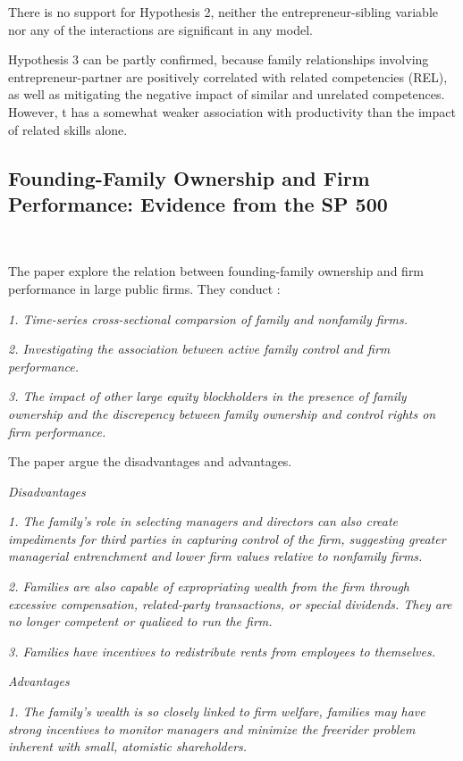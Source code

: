\documentclass{article}
\begin{document}
    There is no support for Hypothesis 2, neither the entrepreneur-sibling variable nor any of the interactions are significant in any model. 

    Hypothesis 3 can be partly confirmed, because family relationships involving entrepreneur-partner are positively correlated with related competencies (REL), as well as mitigating the negative impact of similar and unrelated competences.
    However, t has a somewhat weaker association with productivity than the impact of related skills alone.

\subsection{Founding-Family Ownership and Firm Performance: Evidence from the SP 500}
    ~\

    The paper explore the relation between founding-family ownership and firm performance in large public firms. 
    They conduct :

    \emph{1. Time-series cross-sectional comparsion of family and nonfamily firms. }

    \emph{2. Investigating the association between active family control and firm performance. }

    \emph{3. The impact of other large equity blockholders in the presence of family ownership and the discrepency between 
    family ownership and control rights on firm performance. }

    The paper argue the disadvantages and advantages.

    \emph{Disadvantages}

    \emph{1. The family’s role in selecting managers and directors can also create impediments for third parties in capturing 
    control of the firm, suggesting greater managerial entrenchment and lower firm values relative to nonfamily firms. }

    \emph{2. Families are also capable of expropriating wealth from the firm through excessive compensation, related-party transactions, or special dividends.
    They are no longer competent or quali¢ed to run the firm.}

    \emph{3.  Families have incentives to redistribute rents from employees to themselves.}

    \emph{Advantages}

    \emph{1. The family’s wealth is so closely linked to firm welfare, families may have strong incentives 
    to monitor managers and minimize the freerider problem inherent with small, atomistic shareholders. }
\end{document}
